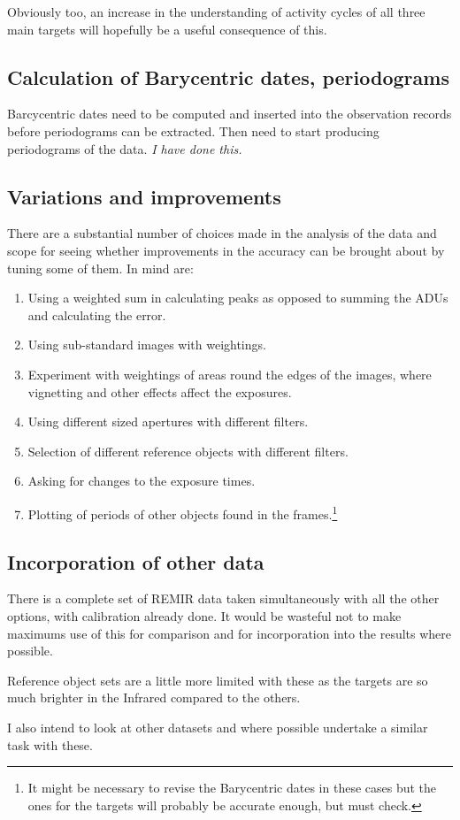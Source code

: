 Obviously too, an increase in the understanding of activity cycles of all three
main targets will hopefully be a useful consequence of this.

\subsection{Calculation of Barycentric dates, periodograms}
\protect\label{section:fwbarycentric}

Barcycentric dates need to be computed and inserted into the observation records
before periodograms can be extracted. Then need to start producing periodograms
of the data. \textit{I have done this.}

\subsection{Variations and improvements}
\protect\label{section:fwvariations}

There are a substantial number of choices made in the analysis of the data and
scope for seeing whether improvements in the accuracy can be brought about by
tuning some of them. In mind are:

\begin{enumerate}
  \item Using a weighted sum in calculating peaks as opposed to summing the ADUs
  and calculating the error.
  \item Using sub-standard images with weightings.
  \item Experiment with weightings of areas round the edges of the images, where
  vignetting and other effects affect the exposures.
  \item Using different sized apertures with different filters.
  \item Selection of different reference objects with different filters.
  \item Asking for changes to the exposure times.
  \item Plotting of periods of other objects found in the frames.\footnote{It
  might be necessary to revise the Barycentric dates in these cases but the
  ones for the targets will probably be accurate enough, but must check.}
\end{enumerate}

\subsection{Incorporation of other data}
\protect\label{section:fwincorp}

There is a complete set of REMIR data taken simultaneously with all the other
options, with calibration already done. It would be wasteful not to make
maximums use of this for comparison and for incorporation into the results where
possible.

Reference object sets are a little more limited with these as the {\rdwarf}
targets are so much brighter in the Infrared compared to the others.

I also intend to look at other datasets and where possible undertake a similar
task with these.

\clearpage
